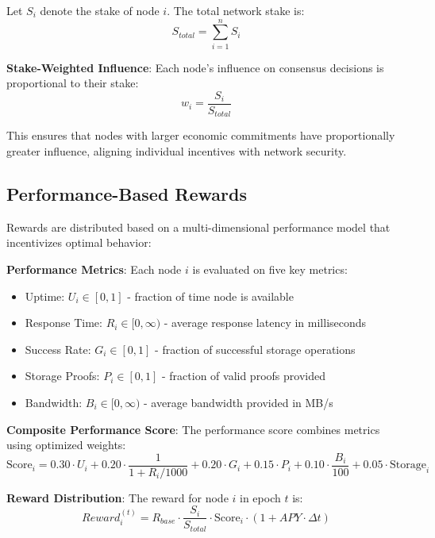 \documentclass[11pt,a4paper]{article}
\begin{document}
Let $S_i$ denote the stake of node $i$. The total network stake is:
\begin{equation}
S_{total} = \sum_{i=1}^{n} S_i
\end{equation}

\textbf{Stake-Weighted Influence}: Each node's influence on consensus decisions is proportional to their stake:
\begin{equation}
w_i = \frac{S_i}{S_{total}}
\end{equation}

This ensures that nodes with larger economic commitments have proportionally greater influence, aligning individual incentives with network security.

\subsection{Performance-Based Rewards}

Rewards are distributed based on a multi-dimensional performance model that incentivizes optimal behavior:

\textbf{Performance Metrics}: Each node $i$ is evaluated on five key metrics:
\begin{itemize}
\item Uptime: $U_i \in [0,1]$ - fraction of time node is available
\item Response Time: $R_i \in [0,\infty)$ - average response latency in milliseconds
\item Success Rate: $G_i \in [0,1]$ - fraction of successful storage operations
\item Storage Proofs: $P_i \in [0,1]$ - fraction of valid proofs provided
\item Bandwidth: $B_i \in [0,\infty)$ - average bandwidth provided in MB/s
\end{itemize}

\textbf{Composite Performance Score}: The performance score combines metrics using optimized weights:
\begin{equation}
\text{Score}_i = 0.30 \cdot U_i + 0.20 \cdot \frac{1}{1 + R_i/1000} + 0.20 \cdot G_i + 0.15 \cdot P_i + 0.10 \cdot \frac{B_i}{100} + 0.05 \cdot \text{Storage}_i
\end{equation}

\textbf{Reward Distribution}: The reward for node $i$ in epoch $t$ is:
\begin{equation}
Reward_i^{(t)} = R_{base} \cdot \frac{S_i}{S_{total}} \cdot \text{Score}_i \cdot (1 + APY \cdot \Delta t)
\end{equation}
\end{document}
